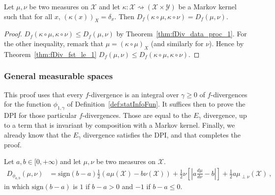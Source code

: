 \begin{lemma}
  \label{lem:fDiv_compProd_prod_eq}
  Let $\mu, \nu$ be two measures on $\mathcal X$ and let $\kappa : \mathcal X \rightsquigarrow (\mathcal X \times \mathcal Y)$ be a Markov kernel such that for all $x$, $(\kappa(x))_X = \delta_x$. Then $D_f(\kappa \circ \mu, \kappa \circ \nu) = D_f(\mu, \nu)$.
\end{lemma}

\begin{proof}
$D_f(\kappa \circ \mu, \kappa \circ \nu) \le D_f(\mu, \nu)$ by Theorem~\ref{thm:fDiv_data_proc_1}.
For the other inequality, remark that $\mu = (\kappa \circ \mu)_X$ (and similarly for $\nu$). Hence by Theorem~\ref{thm:fDiv_fst_le_1} $D_f(\mu, \nu) \le D_f(\kappa \circ \mu, \kappa \circ \nu)$.
\end{proof}




\subsubsection{General measurable spaces}

This proof uses that every $f$-divergence is an integral over $\gamma \ge 0$ of $f$-divergences for the function $\phi_{1,\gamma}$ of Definition~\ref{def:statInfoFun}. It suffices then to prove the DPI for those particular $f$-divergences. Those are equal to the $E_\gamma$ divergence, up to a term that is invariant by composition with a Markov kernel. Finally, we already know that the $E_\gamma$ divergence satisfies the DPI, and that completes the proof.

\begin{lemma}
  \label{lem:fDiv_statInfoFun_eq}
  \leanok
  Let $a,b \in [0, +\infty)$ and let $\mu, \nu$ be two measures on $\mathcal X$.
  \begin{align*}
  D_{\phi_{a,b}}(\mu, \nu)
  &= \text{sign}(b-a)\frac{1}{2}(a \mu(\mathcal X) - b \nu(\mathcal X)) + \frac{1}{2}\nu\left[ \left\vert a \frac{d\mu}{d\nu} - b \right\vert \right] + \frac{1}{2}a \mu_{\perp \nu}(\mathcal X)
  \: ,
  \end{align*}
  in which $\text{sign}(b-a)$ is $1$ if $b-a > 0$ and $-1$ if $b-a \le 0$.
\end{lemma}

